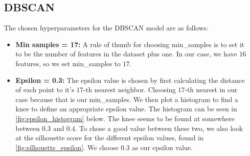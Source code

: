 \subsection{DBSCAN}

The chosen hyperparameters for the DBSCAN model are as follows:

\begin{itemize}
    \item \textbf{Min samples = 17:} A rule of thumb for choosing min\_samples is to set it to be the number of features in the dataset plus one. In our case, we have $16$ features, so we set min\_samples to $17$.
    \item \textbf{Epsilon = 0.3:} The epsilon value is chosen by first calculating the distance of each point to it's $17$-th nearest neighbor. Choosing $17$-th nearest in our case because that is our min\_samples. We then plot a histogram to find a knee to define an appropriate epsilon value. The histogram can be seen in \autoref{fig:epsilon_histogram} below. The knee seems to be found at somewhere between $0.3$ and $0.4$. To chose a good value between these two, we also look at the silhouette score for the different epsilon values, found in \autoref{fig:silhouette_epsilon}. We choose $0.3$ as our epsilon value.
\end{itemize}

